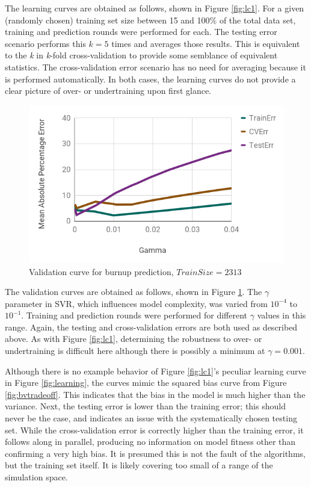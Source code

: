 The learning curves are obtained as follows, shown in Figure \ref{fig:lc1}.
For a given (randomly chosen) training set size between 15 and 100\% of the
total data set, training and prediction rounds were performed for each. The
testing error scenario performs this $k=5$ times and averages those
results.  This is equivalent to the \textit{k} in \textit{k}-fold
cross-validation to provide some semblance of equivalent statistics.  The
cross-validation error scenario has no need for averaging because it is
performed automatically. In both cases, the learning curves do not provide a
clear picture of over- or undertraining upon first glance.

\begin{figure}[!htb]
    \centering
    \includegraphics[width=\linewidth]{./chapters/demo_method/vc1.png}
    \caption{Validation curve for burnup prediction, $TrainSize = 2313$}
    \label{fig:vc1}
\end{figure}

The validation curves are obtained as follows, shown in Figure \ref{fig:vc1}.
The $\gamma$ parameter in \gls{SVR}, which influences model complexity, was
varied from $10^{-4}$ to $10^{-1}$. Training and prediction rounds were
performed for different $\gamma$ values in this range.  Again, the testing and
cross-validation errors are both used as described above. As with Figure
\ref{fig:lc1}, determining the robustness to over- or undertraining is
difficult here although there is possibly a minimum at $\gamma = 0.001$.

Although there is no example behavior of Figure \ref{fig:lc1}'s peculiar
learning curve in Figure \ref{fig:learning}, the curves mimic the squared bias
curve from Figure \ref{fig:bvtradeoff}. This indicates that the bias in the
model is much higher than the variance.  Next, the testing error is lower than
the training error; this should never be the case, and indicates an issue with
the systematically chosen testing set.  While the cross-validation error is
correctly higher than the training error, it follows along in parallel,
producing no information on model fitness other than confirming a very high
bias.  It is presumed this is not the fault of the algorithms, but the training
set itself.  It is likely covering too small of a range of the simulation
space.

